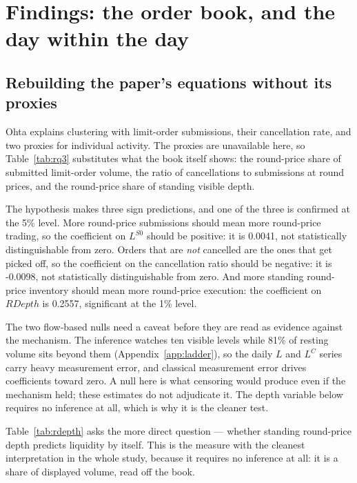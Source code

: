 
\section{Findings: the order book, and the day within the day}
\label{sec:book}

\subsection{Rebuilding the paper's equations without its proxies}



Ohta explains clustering with limit-order submissions, their cancellation rate,
and two proxies for individual activity. The proxies are unavailable here, so
Table~\ref{tab:rq3} substitutes what the book itself shows: the round-price
share of submitted limit-order volume, the ratio of cancellations to submissions
at round prices, and the round-price share of standing visible depth.

The hypothesis makes three sign predictions, and one of the
three is confirmed at the 5\% level. More
round-price submissions should mean more round-price trading, so the
coefficient on $L^{S0}$ should be positive: it is 0.0041,
not statistically distinguishable from zero. Orders that are \emph{not} cancelled are the ones that get
picked off, so the coefficient on the cancellation ratio should be negative:
it is -0.0098, not statistically distinguishable from zero. And more standing round-price
inventory should mean more round-price execution: the coefficient on
$\mathit{RDepth}$ is 0.2557, significant at the 1\% level.

The two flow-based nulls need a caveat before they are read as evidence against the mechanism. The inference watches ten visible levels while 81\% of resting volume sits beyond them (Appendix~\ref{app:ladder}), so the daily $L$ and $L^{C}$ series carry heavy measurement error, and classical measurement error drives coefficients toward zero. A null here is what censoring would produce even if the mechanism held; these estimates do not adjudicate it. The depth variable below requires no inference at all, which is why it is the cleaner test.



Table~\ref{tab:rdepth} asks the more direct question --- whether standing
round-price depth predicts liquidity by itself. This is the measure with the
cleanest interpretation in the whole study, because it requires no inference at
all: it is a share of displayed volume, read off the book.

